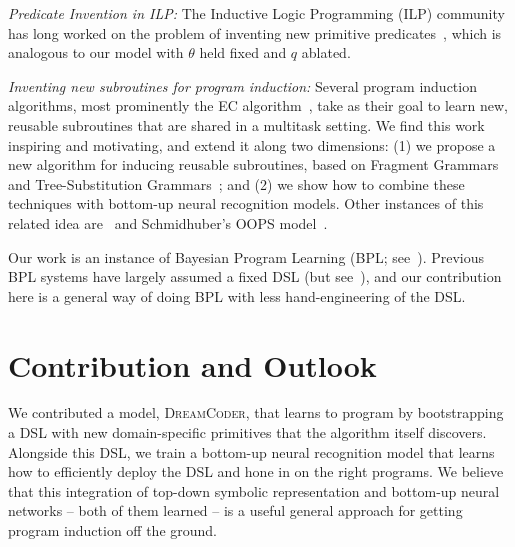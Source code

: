 \documentclass{article}
\newcommand{\systemEnding}{\textsc{DreamCoder}}
\begin{document}
 \noindent \emph{Predicate Invention in ILP:} The Inductive Logic Programming (ILP) community
 has long worked on the problem of inventing new primitive predicates~\cite{DBLP:conf/ecai/LinDETM14,muggleton2015meta}, which is analogous to our model with $\theta$ held fixed and $q$ ablated.

 \noindent \emph{Inventing new subroutines for program induction:}
 Several program induction algorithms, most prominently the EC algorithm~\cite{Dechter:2013:BLV:2540128.2540316}, take as their goal to learn new, reusable subroutines that are shared in a multitask setting. We find this work inspiring and motivating,
 and extend it along two dimensions: (1) we propose a new algorithm for
 inducing reusable subroutines, based on Fragment Grammars~\cite{tim} and Tree-Substitution Grammars~\cite{cohn2010inducing};
 and (2) we show how to combine these techniques with bottom-up neural recognition models.
 Other instances of this related idea are~\cite{DBLP:conf/icml/LiangJK10} and Schmidhuber's OOPS model~\cite{schmidhuber2004optimal}.
 
 Our work is an instance of
 Bayesian Program
 Learning (BPL; see~\citep{lake2013one,Dechter:2013:BLV:2540128.2540316,ellis2016sampling,DBLP:conf/icml/LiangJK10}). Previous BPL systems have largely assumed a fixed DSL (but see~\cite{DBLP:conf/icml/LiangJK10}),
 and our contribution here is a general way of doing BPL with less hand-engineering of the DSL.
 
 \section{Contribution and Outlook}
 We contributed a model, \systemEnding, that learns to program by
 bootstrapping a DSL with new domain-specific primitives that the algorithm itself discovers.
  Alongside this DSL, we train a bottom-up
 neural recognition model that learns how to efficiently deploy the
 DSL and hone in on the right programs.  We believe that this
 integration of top-down symbolic representation and bottom-up neural
 networks -- both of them learned -- is a useful general approach for
 getting program induction off the ground. 
  






\end{document}
